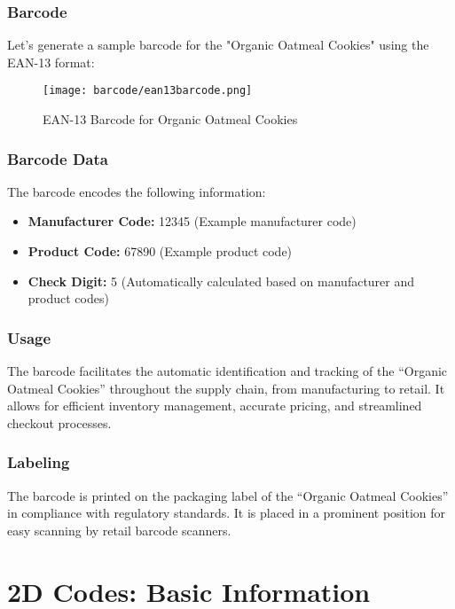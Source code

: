 \subsubsection{Barcode}

Let's generate a sample barcode for the "Organic Oatmeal Cookies" using the EAN-13 format:

\begin{figure}[h]
	\centering
	\texttt{[image: barcode/ean13barcode.png]}
	\caption{EAN-13 Barcode for Organic Oatmeal Cookies}
	\label{fig:ean13_barcode}
\end{figure}

\subsubsection{Barcode Data}

The barcode encodes the following information:

\begin{itemize}
	\item \textbf{Manufacturer Code:} 12345 (Example manufacturer code)
	\item \textbf{Product Code:} 67890 (Example product code)
	\item \textbf{Check Digit:} 5 (Automatically calculated based on manufacturer and product codes)
\end{itemize}

\subsubsection{Usage}

The barcode facilitates the automatic identification and tracking of the ``Organic Oatmeal Cookies'' throughout the supply chain, from manufacturing to retail. It allows for efficient inventory management, accurate pricing, and streamlined checkout processes.

\subsubsection{Labeling}
The barcode is printed on the packaging label of the ``Organic Oatmeal Cookies'' in compliance with regulatory standards. It is placed in a prominent position for easy scanning by retail barcode scanners.




\section{2D Codes: Basic Information}
